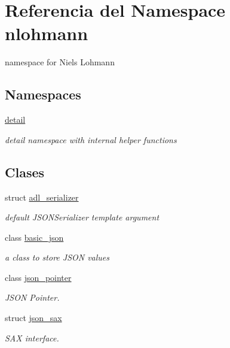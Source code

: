 \hypertarget{namespacenlohmann}{}\section{Referencia del Namespace nlohmann}
\label{namespacenlohmann}


namespace for Niels Lohmann  


\subsection*{Namespaces}
\begin{DoxyCompactItemize}
\item 
 \mbox{\hyperlink{namespacenlohmann_1_1detail}{detail}}
\begin{DoxyCompactList}\small\item\em detail namespace with internal helper functions \end{DoxyCompactList}\end{DoxyCompactItemize}
\subsection*{Clases}
\begin{DoxyCompactItemize}
\item 
struct \mbox{\hyperlink{structnlohmann_1_1adl__serializer}{adl\+\_\+serializer}}
\begin{DoxyCompactList}\small\item\em default J\+S\+O\+N\+Serializer template argument \end{DoxyCompactList}\item 
class \mbox{\hyperlink{classnlohmann_1_1basic__json}{basic\+\_\+json}}
\begin{DoxyCompactList}\small\item\em a class to store J\+S\+ON values \end{DoxyCompactList}\item 
class \mbox{\hyperlink{classnlohmann_1_1json__pointer}{json\+\_\+pointer}}
\begin{DoxyCompactList}\small\item\em J\+S\+ON Pointer. \end{DoxyCompactList}\item 
struct \mbox{\hyperlink{structnlohmann_1_1json__sax}{json\+\_\+sax}}
\begin{DoxyCompactList}\small\item\em S\+AX interface. \end{DoxyCompactList}\end{DoxyCompactItemize}
